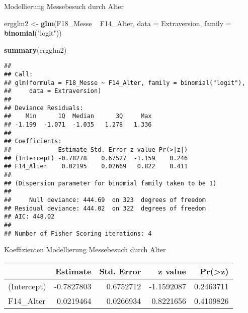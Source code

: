 \documentclass[ignorenonframetext,]{beamer}
\newenvironment{Shaded}{\begin{snugshade}}{\end{snugshade}}
\newcommand{\KeywordTok}[1]{\textcolor[rgb]{0.13,0.29,0.53}{\textbf{{#1}}}}
\newcommand{\DataTypeTok}[1]{\textcolor[rgb]{0.13,0.29,0.53}{{#1}}}
\newcommand{\StringTok}[1]{\textcolor[rgb]{0.31,0.60,0.02}{{#1}}}
\newcommand{\NormalTok}[1]{{#1}}
\begin{document}
\begin{frame}[fragile]{Modellierung Messebesuch durch Alter}

\begin{Shaded}
\begin{Highlighting}[]
\NormalTok{ergglm2 <-}\StringTok{ }\KeywordTok{glm}\NormalTok{(F18_Messe ~}\StringTok{ }\NormalTok{F14_Alter, }
              \DataTypeTok{data =} \NormalTok{Extraversion,}
              \DataTypeTok{family =} \KeywordTok{binomial}\NormalTok{(}\StringTok{"logit"}\NormalTok{))}
              
\KeywordTok{summary}\NormalTok{(ergglm2)}
\end{Highlighting}
\end{Shaded}

\begin{verbatim}
## 
## Call:
## glm(formula = F18_Messe ~ F14_Alter, family = binomial("logit"), 
##     data = Extraversion)
## 
## Deviance Residuals: 
##    Min      1Q  Median      3Q     Max  
## -1.199  -1.071  -1.035   1.278   1.336  
## 
## Coefficients:
##             Estimate Std. Error z value Pr(>|z|)
## (Intercept) -0.78278    0.67527  -1.159    0.246
## F14_Alter    0.02195    0.02669   0.822    0.411
## 
## (Dispersion parameter for binomial family taken to be 1)
## 
##     Null deviance: 444.69  on 323  degrees of freedom
## Residual deviance: 444.02  on 322  degrees of freedom
## AIC: 448.02
## 
## Number of Fisher Scoring iterations: 4
\end{verbatim}

\end{frame}

\begin{frame}{Koeffizienten Modellierung Messebesuch durch Alter}

\begin{longtable}[]{@{}lrrrr@{}}
\toprule
\begin{minipage}[b]{0.19\columnwidth}\raggedright\strut
\strut
\end{minipage} & \begin{minipage}[b]{0.19\columnwidth}\raggedleft\strut
Estimate\strut
\end{minipage} & \begin{minipage}[b]{0.19\columnwidth}\raggedleft\strut
Std. Error\strut
\end{minipage} & \begin{minipage}[b]{0.19\columnwidth}\raggedleft\strut
z value\strut
\end{minipage} & \begin{minipage}[b]{0.19\columnwidth}\raggedleft\strut
Pr(\textgreater{}\textbar{}z\textbar{})\strut
\end{minipage}\tabularnewline
\midrule
\endhead
(Intercept) & -0.7827803 & 0.6752712 & -1.1592087 &
0.2463711\tabularnewline
F14\_Alter & 0.0219464 & 0.0266934 & 0.8221656 &
0.4109826\tabularnewline
\bottomrule
\end{longtable}

\end{frame}
\end{document}
